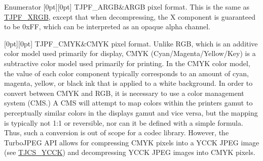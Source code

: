 \begin{DoxyEnumFields}{Enumerator}
[0pt][0pt]{}\mbox{\label{group___turbo_j_p_e_g_ggac916144e26c3817ac514e64ae5d12e2aae8f846ed9d9de99b6e1dfe448848765c}} 
T\+J\+P\+F\+\_\+\+A\+R\+GB&A\+R\+GB pixel format. This is the same as \hyperlink{group___turbo_j_p_e_g_ggac916144e26c3817ac514e64ae5d12e2aadae996905efcfa3b42a0bb3bea7f9d84}{T\+J\+P\+F\+\_\+\+X\+R\+GB}, except that when decompressing, the X component is guaranteed to be 0x\+FF, which can be interpreted as an opaque alpha channel. \\
\hline

[0pt][0pt]{}\mbox{\label{group___turbo_j_p_e_g_ggac916144e26c3817ac514e64ae5d12e2aa7f5100ec44c91994e243f1cf55553f8b}} 
T\+J\+P\+F\+\_\+\+C\+M\+YK&C\+M\+YK pixel format. Unlike R\+GB, which is an additive color model used primarily for display, C\+M\+YK (Cyan/\+Magenta/\+Yellow/\+Key) is a subtractive color model used primarily for printing. In the C\+M\+YK color model, the value of each color component typically corresponds to an amount of cyan, magenta, yellow, or black ink that is applied to a white background. In order to convert between C\+M\+YK and R\+GB, it is necessary to use a color management system (C\+MS.) A C\+MS will attempt to map colors within the printer\textquotesingle{}s gamut to perceptually similar colors in the display\textquotesingle{}s gamut and vice versa, but the mapping is typically not 1\+:1 or reversible, nor can it be defined with a simple formula. Thus, such a conversion is out of scope for a codec library. However, the Turbo\+J\+P\+EG A\+PI allows for compressing C\+M\+YK pixels into a Y\+C\+CK J\+P\+EG image (see \hyperlink{group___turbo_j_p_e_g_gga4f83ad3368e0e29d1957be0efa7c3720a53839e0fe867b76b58d16b0a1a7c598e}{T\+J\+C\+S\+\_\+\+Y\+C\+CK}) and decompressing Y\+C\+CK J\+P\+EG images into C\+M\+YK pixels. \\
\hline

\end{DoxyEnumFields}
\mbox{\label{group___turbo_j_p_e_g_ga1d047060ea80bb9820d540bb928e9074}} 
